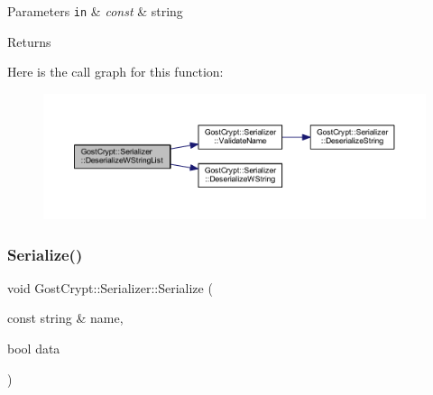 \begin{DoxyParams}[1]{Parameters}
\mbox{\tt in}  & {\em const} & string \\
\hline
\end{DoxyParams}
\begin{DoxyReturn}{Returns}

\end{DoxyReturn}
Here is the call graph for this function\+:
\nopagebreak
\begin{figure}[H]
\begin{center}
\leavevmode
\includegraphics[width=350pt]{class_gost_crypt_1_1_serializer_a049d056397f5c2f02a09b42c98f35251_cgraph}
\end{center}
\end{figure}
\mbox{\label{class_gost_crypt_1_1_serializer_aad94f636ca751f12da1efd4926e11453}} 
\subsubsection{\texorpdfstring{Serialize()}{Serialize()}\hspace{0.1cm}{\footnotesize\ttfamily [1/14]}}
{\footnotesize\ttfamily void Gost\+Crypt\+::\+Serializer\+::\+Serialize (\begin{DoxyParamCaption}\item[{const string \&}]{name,  }\item[{bool}]{data }\end{DoxyParamCaption})}


